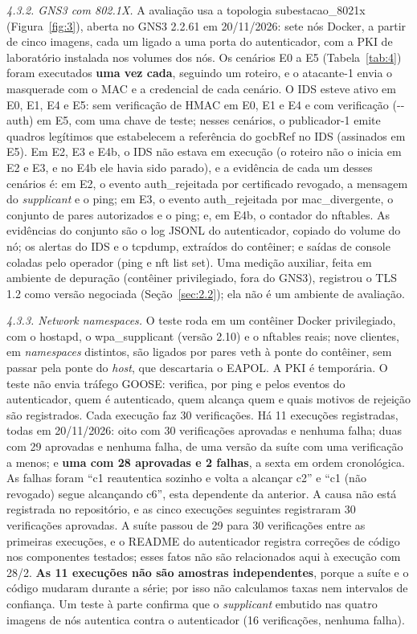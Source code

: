 \documentclass[12pt]{article}
\begin{document}
\emph{4.3.2. GNS3 com 802.1X.} A avaliação usa a topologia subestacao\_\allowbreak{}8021x (Figura~\ref{fig:3}), aberta no GNS3 2.2.61 em 20/11/2026: sete nós Docker, a partir de cinco imagens, cada um ligado a uma porta do autenticador, com a PKI de laboratório instalada nos volumes dos nós. Os cenários E0 a E5 (Tabela~\ref{tab:4}) foram executados \textbf{uma vez cada}, seguindo um roteiro, e o atacante-1 envia o masquerade com o MAC e a credencial de cada cenário. O IDS esteve ativo em E0, E1, E4 e E5: sem verificação de HMAC em E0, E1 e E4 e com verificação (-{}-auth) em E5, com uma chave de teste; nesses cenários, o publicador-1 emite quadros legítimos que estabelecem a referência do gocbRef no IDS (assinados em E5). Em E2, E3 e E4b, o IDS não estava em execução (o roteiro não o inicia em E2 e E3, e no E4b ele havia sido parado), e a evidência de cada um desses cenários é: em E2, o evento auth\_\allowbreak{}rejeitada por certificado revogado, a mensagem do \emph{supplicant} e o ping; em E3, o evento auth\_\allowbreak{}rejeitada por mac\_\allowbreak{}divergente, o conjunto de pares autorizados e o ping; e, em E4b, o contador do nftables. As evidências do conjunto são o log JSONL do autenticador, copiado do volume do nó; os alertas do IDS e o tcpdump, extraídos do contêiner; e saídas de console coladas pelo operador (ping e nft list set). Uma medição auxiliar, feita em ambiente de depuração (contêiner privilegiado, fora do GNS3), registrou o TLS 1.2 como versão negociada (Seção~\ref{sec:2.2}); ela não é um ambiente de avaliação.

\emph{4.3.3. Network namespaces.} O teste roda em um contêiner Docker privilegiado, com o hostapd, o wpa\_\allowbreak{}supplicant (versão 2.10) e o nftables reais; nove clientes, em \emph{namespaces} distintos, são ligados por pares veth à ponte do contêiner, sem passar pela ponte do \emph{host}, que descartaria o EAPOL. A PKI é temporária. O teste não envia tráfego GOOSE: verifica, por ping e pelos eventos do autenticador, quem é autenticado, quem alcança quem e quais motivos de rejeição são registrados. Cada execução faz 30 verificações. Há 11 execuções registradas, todas em 20/11/2026: oito com 30 verificações aprovadas e nenhuma falha; duas com 29 aprovadas e nenhuma falha, de uma versão da suíte com uma verificação a menos; e \textbf{uma com 28 aprovadas e 2 falhas}, a sexta em ordem cronológica. As falhas foram \textquotedblleft{}c1 reautentica sozinho e volta a alcançar c2\textquotedblright{} e \textquotedblleft{}c1 (não revogado) segue alcançando c6\textquotedblright{}, esta dependente da anterior. A causa não está registrada no repositório, e as cinco execuções seguintes registraram 30 verificações aprovadas. A suíte passou de 29 para 30 verificações entre as primeiras execuções, e o README do autenticador registra correções de código nos componentes testados; esses fatos não são relacionados aqui à execução com 28/2. \textbf{As 11 execuções não são amostras independentes}, porque a suíte e o código mudaram durante a série; por isso não calculamos taxas nem intervalos de confiança. Um teste à parte confirma que o \emph{supplicant} embutido nas quatro imagens de nós autentica contra o autenticador (16 verificações, nenhuma falha).
\end{document}
